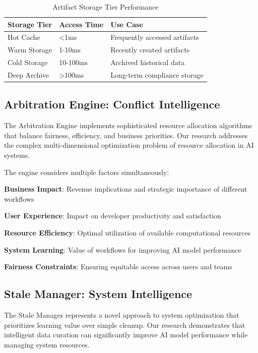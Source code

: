 \begin{table}[ht]
\centering
\begin{tabular}{@{}lll@{}}
\toprule
\textbf{Storage Tier} & \textbf{Access Time} & \textbf{Use Case} \\
\midrule
Hot Cache & <1ms & Frequently accessed artifacts \\
Warm Storage & 1-10ms & Recently created artifacts \\
Cold Storage & 10-100ms & Archived historical data \\
Deep Archive & >100ms & Long-term compliance storage \\
\bottomrule
\end{tabular}
\caption{Artifact Storage Tier Performance}
\end{table}

\subsection*{Arbitration Engine: Conflict Intelligence}

The Arbitration Engine implements sophisticated resource allocation algorithms that balance fairness, efficiency, and business priorities. Our research addresses the complex multi-dimensional optimization problem of resource allocation in AI systems.

The engine considers multiple factors simultaneously:

\begin{expandedlist}
    \item \textbf{Business Impact}: Revenue implications and strategic importance of different workflows
    \item \textbf{User Experience}: Impact on developer productivity and satisfaction
    \item \textbf{Resource Efficiency}: Optimal utilization of available computational resources
    \item \textbf{System Learning}: Value of workflows for improving AI model performance
    \item \textbf{Fairness Constraints}: Ensuring equitable access across users and teams
\end{expandedlist}

\subsection*{Stale Manager: System Intelligence}

The Stale Manager represents a novel approach to system optimization that prioritizes learning value over simple cleanup. Our research demonstrates that intelligent data curation can significantly improve AI model performance while managing system resources.

